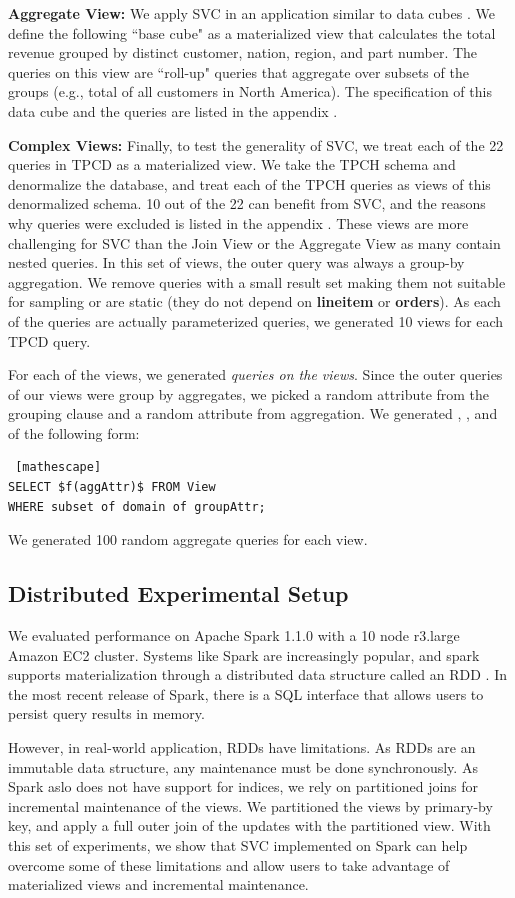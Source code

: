 \textbf{Aggregate View: } We apply SVC in an application similar to data cubes \cite{gray1997data}.
We define the following ``base cube" as a materialized view that calculates the total revenue 
grouped by distinct customer, nation, region, and part number.
The queries on this view are ``roll-up" queries that aggregate over 
subsets of the groups (e.g., total of all customers in North America).
The specification of this data cube and the queries are listed in the appendix .

\textbf{Complex Views:} Finally, to test the generality of SVC, we treat each of the 22 queries in TPCD as a materialized view.
We take the TPCH schema and denormalize the database, and treat each of the TPCH queries as views of this denormalized schema. 
10 out of the 22 can benefit from SVC, and the reasons why queries were excluded is listed in the appendix .
These views are more challenging for SVC than the Join View or the Aggregate View as many contain nested queries.
In this set of views, the outer query was always a group-by aggregation.
We remove queries with a small result set making them not suitable for sampling or are static (they do not depend on \textbf{lineitem} or \textbf{orders}). 
As each of the queries are actually parameterized queries, we generated 10 views for each TPCD query.

For each of the views, we generated \emph{queries on the views}.
Since the outer queries of our views were group by aggregates, we picked a random attribute from the grouping clause and a random attribute from aggregation.
We generated \sumfunc, \avgfunc, and \countfunc of the following form:
\begin{lstlisting} [mathescape]
SELECT $f(aggAttr)$ FROM View 
WHERE subset of domain of groupAttr;
\end{lstlisting}
We generated 100 random aggregate queries for each view.

\subsection{Distributed Experimental Setup}
We evaluated performance on Apache Spark 1.1.0 with a 10 node r3.large Amazon EC2 cluster.
Systems like Spark are increasingly popular, and spark supports materialization through a distributed data structure called an RDD \cite{zaharia2012resilient}.
In the most recent release of Spark, there is a SQL interface that allows users to persist query results in memory.

However, in real-world application, RDDs have limitations.
As RDDs are an immutable data structure, any maintenance must be done synchronously.
As Spark aslo does not have support for indices, we rely on partitioned joins for incremental maintenance of the views.
We partitioned the views by primary-by key, and apply a full outer join of the updates with the partitioned view.
With this set of experiments, we show that SVC implemented on Spark can help overcome some of these limitations and allow users to take advantage of materialized views and incremental maintenance.

